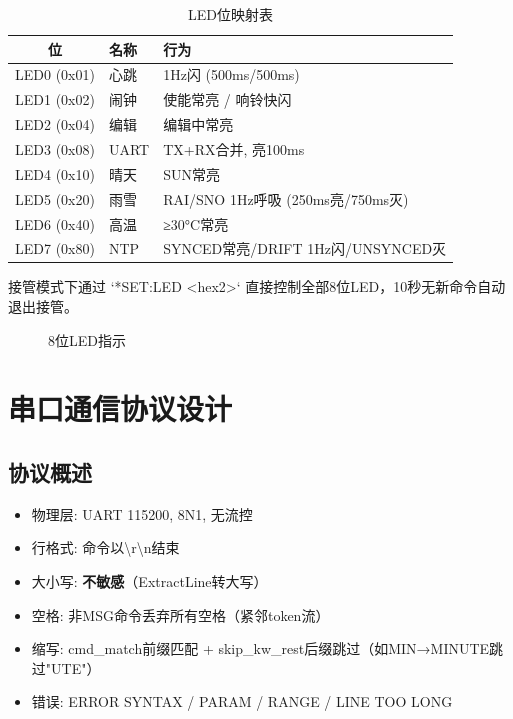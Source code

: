 \documentclass[12pt,hyperref,a4paper,UTF8]{ctexart}
\begin{document}
\begin{table}[!htbp]
    \centering
    \begin{tabular}{c|l|l}
    \hline
    \textbf{位} & \textbf{名称} & \textbf{行为} \\
    \hline
    LED0 (0x01) & 心跳 & 1Hz闪 (500ms/500ms) \\
    LED1 (0x02) & 闹钟 & 使能常亮 / 响铃快闪 \\
    LED2 (0x04) & 编辑 & 编辑中常亮 \\
    LED3 (0x08) & UART & TX+RX合并, 亮100ms \\
    LED4 (0x10) & 晴天 & SUN常亮 \\
    LED5 (0x20) & 雨雪 & RAI/SNO 1Hz呼吸 (250ms亮/750ms灭) \\
    LED6 (0x40) & 高温 & ≥30°C常亮 \\
    LED7 (0x80) & NTP & SYNCED常亮/DRIFT 1Hz闪/UNSYNCED灭 \\
    \hline
    \end{tabular}
    \caption{LED位映射表}
\end{table}

接管模式下通过 `*SET:LED <hex2>` 直接控制全部8位LED，10秒无新命令自动退出接管。

\begin{figure}[!htbp]
    \centering
    \caption{8位LED指示}
    \label{fig:led}
\end{figure}

\section{串口通信协议设计}

\subsection{协议概述}

\begin{itemize}
    \item 物理层: UART 115200, 8N1, 无流控
    \item 行格式: 命令以\textbackslash r\textbackslash n结束
    \item 大小写: \textbf{不敏感}（ExtractLine转大写）
    \item 空格: 非MSG命令丢弃所有空格（紧邻token流）
    \item 缩写: cmd\_match前缀匹配 + skip\_kw\_rest后缀跳过（如MIN→MINUTE跳过"UTE"）
    \item 错误: ERROR SYNTAX / PARAM / RANGE / LINE TOO LONG
\end{itemize}
\end{document}
